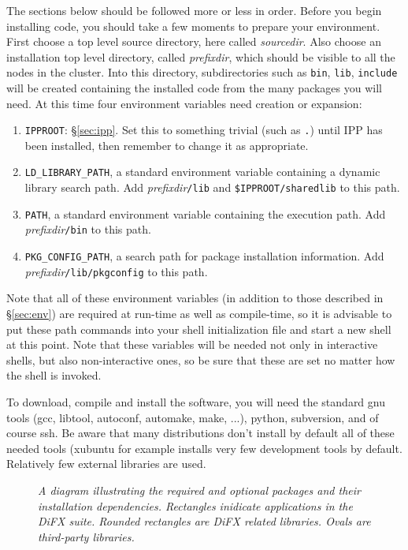 The sections below should be followed more or less in order.
Before you begin installing code, you should take a few moments to prepare your environment.
First choose a top level source directory, here called {\em sourcedir}.
Also choose an installation top level directory, called {\em prefixdir}, which should be visible to all the nodes in the cluster.  
Into this directory, subdirectories such as {\tt bin}, {\tt lib}, {\tt include} will be created containing the installed code from the many packages you will need.
At this time four environment variables need creation or expansion:
\begin{enumerate}
\item {\tt IPPROOT}: \S\ref{sec:ipp}.
Set this to something trivial (such as {\tt .}) until IPP has been installed, then remember to change it as appropriate.
\item {\tt LD\_LIBRARY\_PATH}, a standard environment variable containing a dynamic library search path.  
Add {\em prefixdir}{\tt /lib} and {\tt \$IPPROOT/sharedlib} to this path.
\item {\tt PATH}, a standard environment variable containing the execution path.
Add {\em prefixdir}{\tt /bin} to this path.
\item {\tt PKG\_CONFIG\_PATH}, a search path for package installation information.
Add {\em prefixdir}{\tt /lib/pkgconfig} to this path.
\end{enumerate}

Note that all of these environment variables (in addition to those described in \S\ref{sec:env}) are required at run-time as well as compile-time, so it is advisable to put these path commands into your shell initialization file and start a new shell at this point.
Note that these variables will be needed not only in interactive shells, but also non-interactive ones, so be sure that these are set no matter how the shell is invoked.

To download, compile and install the software, you will need the standard gnu tools (gcc, libtool, autoconf, automake, make, ...), python, subversion, and of course ssh.
Be aware that many distributions don't install by default all of these needed tools (xubuntu for example installs very few development tools by default.
Relatively few external libraries are used.

\begin{figure}[h]
\begin{center}
\caption[dependencies]{
{\em A diagram illustrating the required and optional packages and their installation dependencies.  Rectangles inidicate applications in the DiFX suite.  Rounded rectangles are DiFX related libraries.  Ovals are third-party libraries.}
\label{fig:dependencies}
}
\end{center}
\end{figure}

